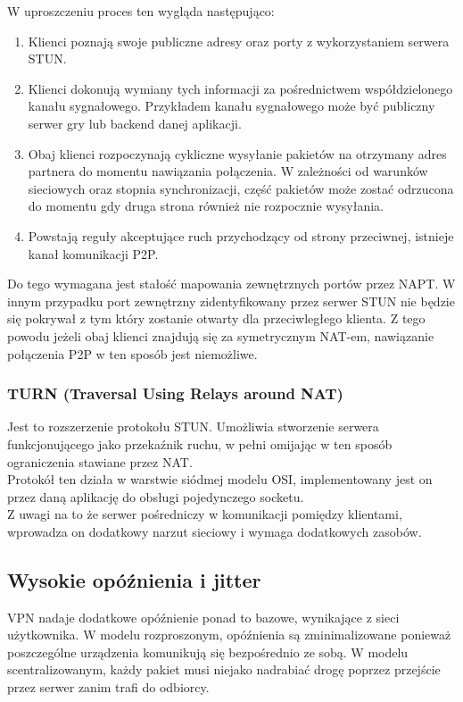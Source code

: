 W uproszczeniu proces ten wygląda następująco:

\begin{enumerate}[leftmargin=*]
    \item Klienci poznają swoje publiczne adresy oraz porty z wykorzystaniem serwera STUN.
    \item Klienci dokonują wymiany tych informacji za pośrednictwem współdzielonego kanału sygnałowego. Przykładem kanału sygnałowego może być publiczny serwer gry lub backend danej aplikacji.
    \item Obaj klienci rozpoczynają cykliczne wysyłanie pakietów na otrzymany adres partnera do momentu nawiązania połączenia. W zależności od warunków sieciowych oraz stopnia synchronizacji, część pakietów może zostać odrzucona do momentu gdy druga strona również nie rozpocznie wysyłania.
    \item Powstają reguły akceptujące ruch przychodzący od strony przeciwnej, istnieje kanał komunikacji P2P.
\end{enumerate}

Do tego wymagana jest stałość mapowania zewnętrznych portów przez NAPT. W innym przypadku port zewnętrzny zidentyfikowany przez serwer STUN nie będzie się pokrywał z tym który zostanie otwarty dla przeciwległego klienta. Z tego powodu jeżeli obaj klienci znajdują się za symetrycznym NAT-em, nawiązanie połączenia P2P w ten sposób jest niemożliwe.\\

\subsubsection{TURN (Traversal Using Relays around NAT)}

Jest to rozszerzenie protokołu STUN. Umożliwia stworzenie serwera funkcjonującego jako przekaźnik ruchu, w pełni omijając w ten sposób ograniczenia stawiane przez NAT. \\

Protokół ten działa w warstwie siódmej modelu OSI, implementowany jest on przez daną aplikację do obsługi pojedynczego socketu.\\

Z uwagi na to że serwer pośredniczy w komunikacji pomiędzy klientami, wprowadza on dodatkowy narzut sieciowy i wymaga dodatkowych zasobów.

\newpage

\subsection{Wysokie opóźnienia i jitter}
VPN nadaje dodatkowe opóźnienie ponad to bazowe, wynikające z sieci użytkownika. W modelu rozproszonym, opóźnienia są zminimalizowane ponieważ poszczególne urządzenia komunikują się bezpośrednio ze sobą. W modelu scentralizowanym, każdy pakiet musi niejako nadrabiać drogę poprzez przejście przez serwer zanim trafi do odbiorcy.\\

